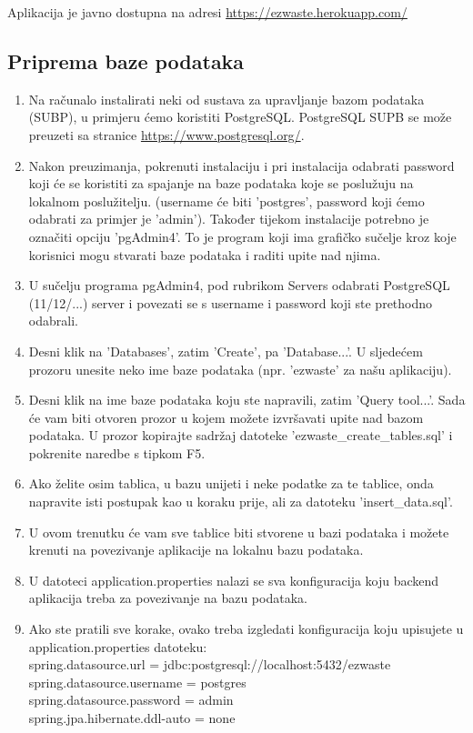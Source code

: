 			Aplikacija je javno dostupna na adresi \url{https://ezwaste.herokuapp.com/}
			
			
			 \subsection{Priprema baze podataka}
				\begin{enumerate}
					\item Na računalo instalirati neki od sustava za upravljanje bazom podataka (SUBP), u primjeru ćemo koristiti PostgreSQL. PostgreSQL SUPB se može preuzeti sa stranice \url{https://www.postgresql.org/}.
					\item Nakon preuzimanja, pokrenuti instalaciju i pri instalacija odabrati password koji će se koristiti za spajanje na 
					baze podataka koje se poslužuju na lokalnom poslužitelju. (username će biti 'postgres', password koji ćemo odabrati za primjer je 'admin'). Također tijekom instalacije potrebno je označiti opciju 'pgAdmin4'. To je program koji ima grafičko sučelje kroz koje korisnici mogu stvarati baze podataka i raditi upite nad njima.
					\item U sučelju programa pgAdmin4, pod rubrikom Servers odabrati PostgreSQL (11/12/...) server i povezati se s username i password koji ste prethodno odabrali.
					\item Desni klik na 'Databases', zatim 'Create', pa 'Database...'. U sljedećem prozoru unesite neko ime baze podataka (npr. 'ezwaste' za našu aplikaciju).
					\item Desni klik na ime baze podataka koju ste napravili, zatim 'Query tool...'. Sada će vam biti otvoren prozor u kojem možete izvršavati upite nad bazom 
					podataka. U prozor kopirajte sadržaj datoteke 'ezwaste\_create\_tables.sql' i pokrenite naredbe s tipkom F5.
					\item Ako želite osim tablica, u bazu unijeti i neke podatke za te tablice, onda napravite isti postupak kao u koraku prije, ali za datoteku 'insert\_data.sql'.
					\item U ovom trenutku će vam sve tablice biti stvorene u bazi podataka i možete krenuti na povezivanje aplikacije na lokalnu bazu podataka.
					\item U datoteci application.properties nalazi se sva konfiguracija koju backend aplikacija treba za povezivanje na bazu podataka.
					\item Ako ste pratili sve korake, ovako treba izgledati konfiguracija koju upisujete u application.properties datoteku:\\
					spring.datasource.url = jdbc:postgresql://localhost:5432/ezwaste\\
					spring.datasource.username = postgres \\
					spring.datasource.password = admin \\
					spring.jpa.hibernate.ddl-auto = none \\
					
				\end{enumerate}
			
